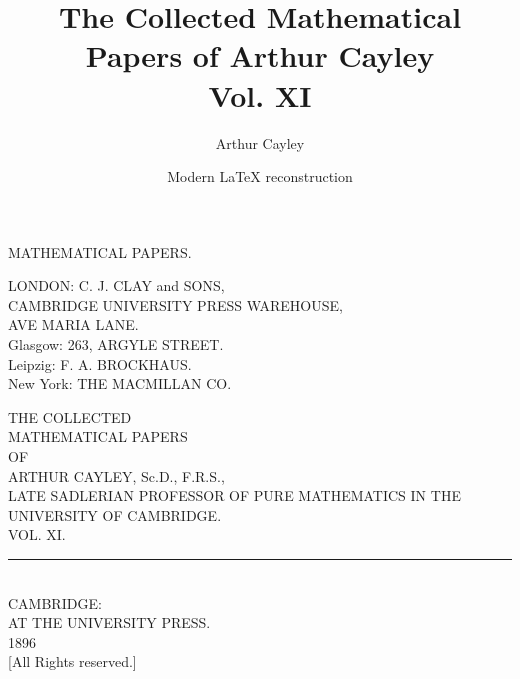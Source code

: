 \documentclass[11pt,a4paper]{book}
\title{The Collected Mathematical Papers of Arthur Cayley\\Vol. XI}
\author{Arthur Cayley}
\date{Modern \LaTeX{} reconstruction}
\begin{document}
\maketitle


\frontmatter

\thispagestyle{empty}
\begin{center}
\vspace*{\fill}
{\Large MATHEMATICAL PAPERS.}
\vspace*{\fill}
\end{center}
\cleardoublepage

\thispagestyle{empty}
\begin{center}
\vspace*{\fill}
\small
LONDON: C. J. CLAY and SONS,\\
CAMBRIDGE UNIVERSITY PRESS WAREHOUSE,\\
AVE MARIA LANE.\\[0.5em]
Glasgow: 263, ARGYLE STREET.\\[0.5em]
Leipzig: F. A. BROCKHAUS.\\
New York: THE MACMILLAN CO.
\vspace*{\fill}
\end{center}
\cleardoublepage

\thispagestyle{empty}
\begin{center}
\vspace*{2em}
{\large THE COLLECTED}\\[1em]
{\LARGE MATHEMATICAL PAPERS}\\[2em]
{\large OF}\\[2em]
{\Large ARTHUR CAYLEY, Sc.D., F.R.S.,}\\[0.5em]
{\footnotesize LATE SADLERIAN PROFESSOR OF PURE MATHEMATICS IN THE UNIVERSITY OF CAMBRIDGE.}\\[4em]
{\Large VOL. XI.}\\[5em]
\rule{0.3\textwidth}{0.4pt}\\[1em]
CAMBRIDGE:\\
AT THE UNIVERSITY PRESS.\\
1896\\[0.5em]
{\small [All Rights reserved.]}
\end{center}
\cleardoublepage
\end{document}
